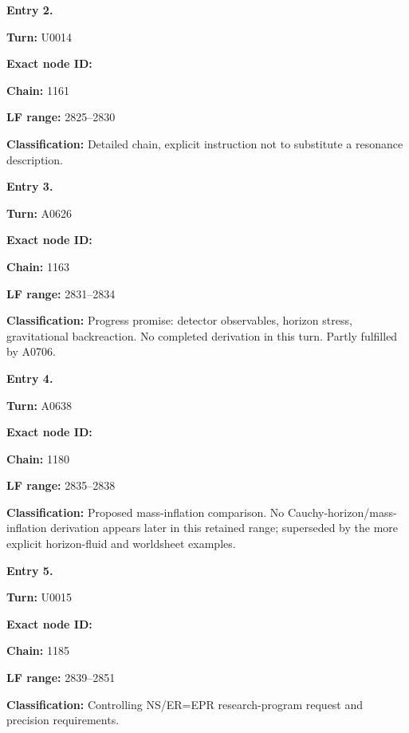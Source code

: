 
\textbf{Entry 2.}

\textbf{Turn:} U0014

\textbf{Exact node ID:}
\protect{}

\textbf{Chain:} 1161

\textbf{LF range:} 2825--2830

\textbf{Classification:} Detailed
\protect{} chain, explicit
instruction not to substitute a resonance description.


\textbf{Entry 3.}

\textbf{Turn:} A0626

\textbf{Exact node ID:}
\protect{}

\textbf{Chain:} 1163

\textbf{LF range:} 2831--2834

\textbf{Classification:} Progress promise: detector observables, horizon
stress, gravitational backreaction. No completed derivation in this
turn. Partly fulfilled by A0706.


\textbf{Entry 4.}

\textbf{Turn:} A0638

\textbf{Exact node ID:}
\protect{}

\textbf{Chain:} 1180

\textbf{LF range:} 2835--2838

\textbf{Classification:} Proposed mass-inflation comparison. No
Cauchy-horizon/mass-inflation derivation appears later in this retained
range; superseded by the more explicit horizon-fluid and worldsheet
examples.


\textbf{Entry 5.}

\textbf{Turn:} U0015

\textbf{Exact node ID:}
\protect{}

\textbf{Chain:} 1185

\textbf{LF range:} 2839--2851

\textbf{Classification:} Controlling NS/ER=EPR research-program request
and precision requirements.


